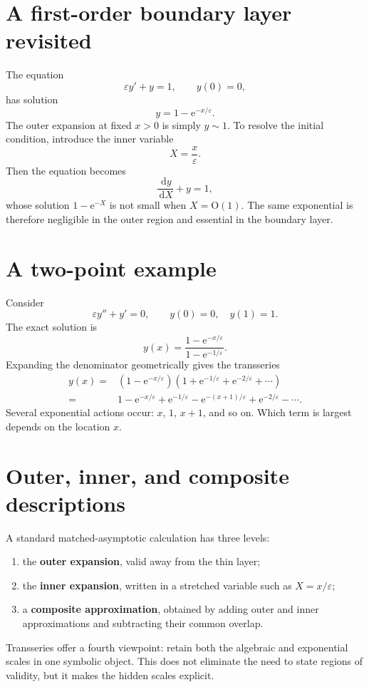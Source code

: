 \documentclass[11pt,openany]{book}
\theoremstyle{plain}
\theoremstyle{definition}
\theoremstyle{remark}
\newcommand{\bigO}{\mathrm{O}}
\newcommand{\dd}{\,\mathrm{d}}
\newcommand{\e}{\mathrm{e}}
\newcommand{\defterm}[1]{\textbf{#1}}
\begin{document}
\section{A first-order boundary layer revisited}
The equation
\[
  \varepsilon y'+y=1,
  \qquad y(0)=0,
\]
has solution
\[
  y=1-\e^{-x/\varepsilon}.
\]
The outer expansion at fixed $x>0$ is simply $y\sim1$. To resolve the initial condition, introduce the inner variable
\[
  X=\frac{x}{\varepsilon}.
\]
Then the equation becomes
\[
  \frac{\dd y}{\dd X}+y=1,
\]
whose solution $1-\e^{-X}$ is not small when $X=\bigO(1)$. The same exponential is therefore negligible in the outer region and essential in the boundary layer.

\section{A two-point example}
Consider
\[
  \varepsilon y''+y'=0,
  \qquad y(0)=0,
  \quad y(1)=1.
  \label{eq:boundary-two-point}
\]
The exact solution is
\[
  y(x)=\frac{1-\e^{-x/\varepsilon}}
  {1-\e^{-1/\varepsilon}}.
\]
Expanding the denominator geometrically gives the transseries
\begin{align*}
 y(x)={}&(1-\e^{-x/\varepsilon})
 \left(1+\e^{-1/\varepsilon}
 +\e^{-2/\varepsilon}+\cdots\right)\\
 ={}&1-\e^{-x/\varepsilon}
 +\e^{-1/\varepsilon}
 -\e^{-(x+1)/\varepsilon}
 +\e^{-2/\varepsilon}-\cdots.
\end{align*}
Several exponential actions occur: $x$, $1$, $x+1$, and so on. Which term is largest depends on the location $x$.

\section{Outer, inner, and composite descriptions}
A standard matched-asymptotic calculation has three levels:
\begin{enumerate}
\item the \defterm{outer expansion}, valid away from the thin layer;
\item the \defterm{inner expansion}, written in a stretched variable such as $X=x/\varepsilon$;
\item a \defterm{composite approximation}, obtained by adding outer and inner approximations and subtracting their common overlap.
\end{enumerate}
Transseries offer a fourth viewpoint: retain both the algebraic and exponential scales in one symbolic object. This does not eliminate the need to state regions of validity, but it makes the hidden scales explicit.
\end{document}
